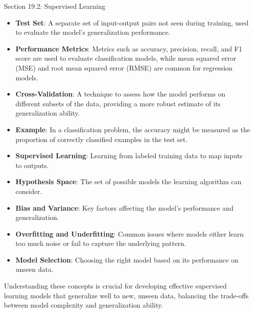 \begin{notes}{Section 19.2: Supervised Learning}
\begin{highlight}
        \begin{itemize}
            \item \textbf{Test Set}: A separate set of input-output pairs not seen during training, used to evaluate the model's generalization performance.
            \item \textbf{Performance Metrics}: Metrics such as accuracy, precision, recall, and F1 score are used to evaluate classification models, while mean squared error (MSE) and root mean squared error (RMSE) are common for regression models.
            \item \textbf{Cross-Validation}: A technique to assess how the model performs on different subsets of the data, providing a more robust estimate of its generalization ability.
            \item \textbf{Example}: In a classification problem, the accuracy might be measured as the proportion of correctly classified examples in the test set.
        \end{itemize}
    
    \end{highlight}
    
    \begin{highlight}
    
        \begin{itemize}
            \item \textbf{Supervised Learning}: Learning from labeled training data to map inputs to outputs.
            \item \textbf{Hypothesis Space}: The set of possible models the learning algorithm can consider.
            \item \textbf{Bias and Variance}: Key factors affecting the model's performance and generalization.
            \item \textbf{Overfitting and Underfitting}: Common issues where models either learn too much noise or fail to capture the underlying pattern.
            \item \textbf{Model Selection}: Choosing the right model based on its performance on unseen data.
        \end{itemize}
    
        Understanding these concepts is crucial for developing effective supervised learning models that generalize well to new, unseen data, balancing the trade-offs between model complexity and generalization ability.
    
    \end{highlight}
\end{notes}


